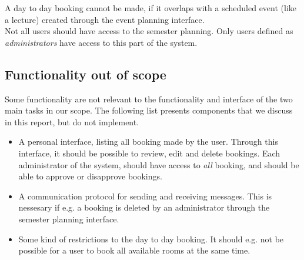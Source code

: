 A day to day booking cannot be made, if it overlaps with a scheduled event (like a lecture) created through the event planning interface.\\

Not all users should have access to the semester planning. Only users defined as \emph{administrators} have access to this part of the system.

\subsection{Functionality out of scope}
Some functionality are not relevant to the functionality and interface of the two main tasks in our scope. The following list presents components that we discuss in this report, but do not implement.

\begin{itemize}
	\item A personal interface, listing all booking made by the user. Through this interface, it should be possible to review, edit and delete bookings. Each administrator of the system, should have access to \emph{all} booking, and should be able to approve or disapprove bookings.
	\item A communication protocol for sending and receiving messages. This is nessesary if e.g. a booking is deleted by an administrator through the semester planning interface.
	\item Some kind of restrictions to the day to day booking. It should e.g. not be possible for a user to book all available rooms at the same time.
\end{itemize}